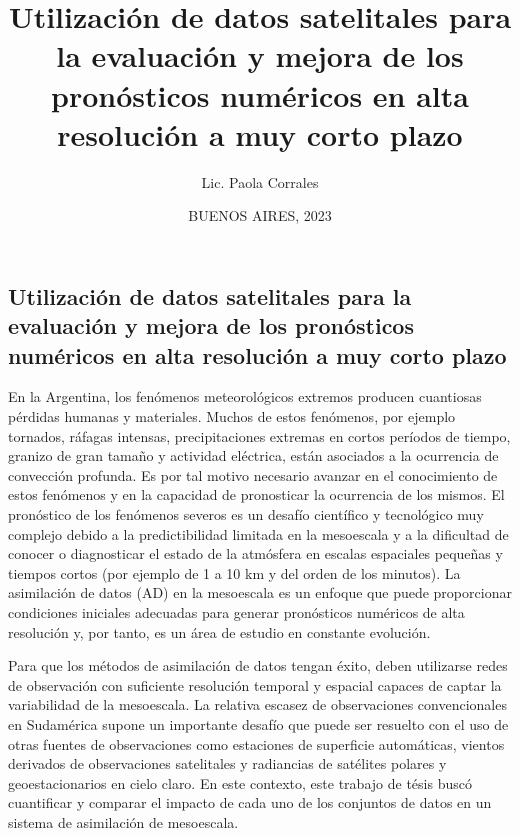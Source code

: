 \documentclass[12pt,oneside,a4paper]{reedthesis}
\title{Utilización de datos satelitales para la evaluación y mejora de los pronósticos numéricos en alta resolución a muy corto plazo}
\author{Lic. Paola Corrales}
\date{BUENOS AIRES, 2023}
\begin{document}
  \maketitle

\frontmatter %
\pagestyle{empty} %
  \begin{resumen}
    \hypertarget{utilizaciuxf3n-de-datos-satelitales-para-la-evaluaciuxf3n-y-mejora-de-los-pronuxf3sticos-numuxe9ricos-en-alta-resoluciuxf3n-a-muy-corto-plazo}{%
    \section*{Utilización de datos satelitales para la evaluación y mejora de los pronósticos numéricos en alta resolución a muy corto plazo}\label{utilizaciuxf3n-de-datos-satelitales-para-la-evaluaciuxf3n-y-mejora-de-los-pronuxf3sticos-numuxe9ricos-en-alta-resoluciuxf3n-a-muy-corto-plazo}}
    
    En la Argentina, los fenómenos meteorológicos extremos producen cuantiosas pérdidas humanas y materiales. Muchos de estos fenómenos, por ejemplo tornados, ráfagas intensas, precipitaciones extremas en cortos períodos de tiempo, granizo de gran tamaño y actividad eléctrica, están asociados a la ocurrencia de convección profunda. Es por tal motivo necesario avanzar en el conocimiento de estos fenómenos y en la capacidad de pronosticar la ocurrencia de los mismos. El pronóstico de los fenómenos severos es un desafío científico y tecnológico muy complejo debido a la predictibilidad limitada en la mesoescala y a la dificultad de conocer o diagnosticar el estado de la atmósfera en escalas espaciales pequeñas y tiempos cortos (por ejemplo de 1 a 10 km y del orden de los minutos). La asimilación de datos (AD) en la mesoescala es un enfoque que puede proporcionar condiciones iniciales adecuadas para generar pronósticos numéricos de alta resolución y, por tanto, es un área de estudio en constante evolución.
    
    Para que los métodos de asimilación de datos tengan éxito, deben utilizarse redes de observación con suficiente resolución temporal y espacial capaces de captar la variabilidad de la mesoescala. La relativa escasez de observaciones convencionales en Sudamérica supone un importante desafío que puede ser resuelto con el uso de otras fuentes de observaciones como estaciones de superficie automáticas, vientos derivados de observaciones satelitales y radiancias de satélites polares y geoestacionarios en cielo claro. En este contexto, este trabajo de tésis buscó cuantificar y comparar el impacto de cada uno de los conjuntos de datos en un sistema de asimilación de mesoescala.
    

\end{resumen}
\end{document}
